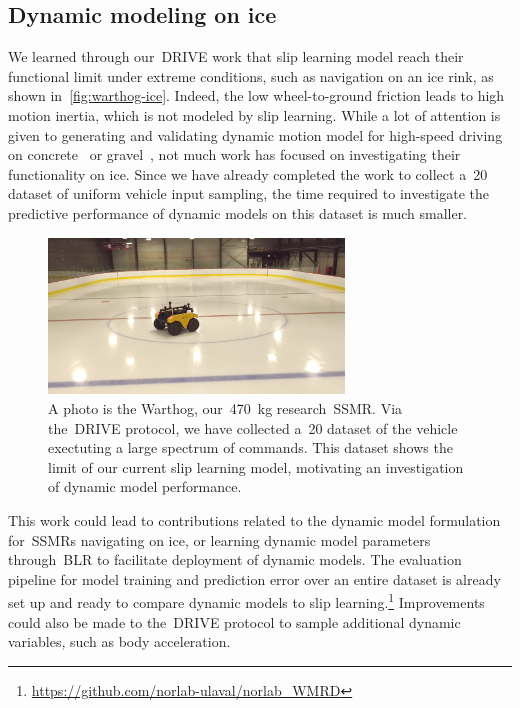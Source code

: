 \documentclass[12pt,letterpaper,oneside]{article}
\begin{document}
\subsection{Dynamic modeling on ice}
We learned through our~\ac{DRIVE} work that slip learning model reach their functional limit under extreme conditions, such as navigation on an ice rink, as shown in~\autoref{fig:warthog-ice}.
Indeed, the low wheel-to-ground friction leads to high motion inertia, which is not modeled by slip learning.
While a lot of attention is given to generating and validating dynamic motion model for high-speed driving on concrete~\citep{Djeumou2023} or gravel~\citep{Williams2018}, not much work has focused on investigating their functionality on ice.
Since we have already completed the work to collect a~\SI{20}{\min} dataset of uniform vehicle input sampling, the time required to investigate the predictive performance of dynamic models on this dataset is much smaller.
\begin{figure}
	\centering
	\includegraphics[width=0.7\textwidth]{figs/warthog_ice.png}
	\caption{
		A photo is the Warthog, our~\SI{470}{\kilo\gram} research~\ac{SSMR}.
		Via the~\ac{DRIVE} protocol, we have collected a~\SI{20}{\min} dataset of the vehicle exectuting a large spectrum of commands.
		This dataset shows the limit of our current slip learning model, motivating an investigation of dynamic model performance.
	}
	\label{fig:warthog-ice}
\end{figure}

This work could lead to contributions related to the dynamic model formulation for~\acp{SSMR} navigating on ice, or learning dynamic model parameters through~\ac{BLR} to facilitate deployment of dynamic models.
The evaluation pipeline for model training and prediction error over an entire dataset is already set up and ready to compare dynamic models to slip learning.\footnote{\url{https://github.com/norlab-ulaval/norlab_WMRD}}
Improvements could also be made to the~\ac{DRIVE} protocol to sample additional dynamic variables, such as body acceleration.
\end{document}
